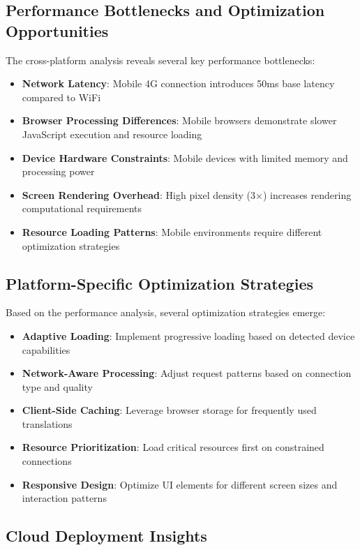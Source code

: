 \documentclass[conference]{IEEEtran}
\begin{document}
\subsection{Performance Bottlenecks and Optimization Opportunities}

The cross-platform analysis reveals several key performance bottlenecks:

\begin{itemize}
    \item \textbf{Network Latency}: Mobile 4G connection introduces 50ms base latency compared to WiFi
    \item \textbf{Browser Processing Differences}: Mobile browsers demonstrate slower JavaScript execution and resource loading
    \item \textbf{Device Hardware Constraints}: Mobile devices with limited memory and processing power
    \item \textbf{Screen Rendering Overhead}: High pixel density (3×) increases rendering computational requirements
    \item \textbf{Resource Loading Patterns}: Mobile environments require different optimization strategies
\end{itemize}

\subsection{Platform-Specific Optimization Strategies}

Based on the performance analysis, several optimization strategies emerge:

\begin{itemize}
    \item \textbf{Adaptive Loading}: Implement progressive loading based on detected device capabilities
    \item \textbf{Network-Aware Processing}: Adjust request patterns based on connection type and quality
    \item \textbf{Client-Side Caching}: Leverage browser storage for frequently used translations
    \item \textbf{Resource Prioritization}: Load critical resources first on constrained connections
    \item \textbf{Responsive Design}: Optimize UI elements for different screen sizes and interaction patterns
\end{itemize}

\subsection{Cloud Deployment Insights}
\end{document}

